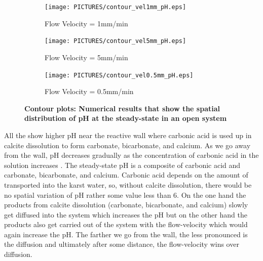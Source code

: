 \begin{figure}[!h]
\centering
    \begin{subfigure}{.5\linewidth}
        \centering
        \texttt{[image: PICTURES/contour\_vel1mm\_pH.eps]}
        \caption{\small Flow Velocity = 1mm/min}
        \label{fig:pHSteady-state}       %
    \end{subfigure}%
    \hfill
    \begin{subfigure}{.5\linewidth}
        \centering
        \texttt{[image: PICTURES/contour\_vel5mm\_pH.eps]}
        \caption{\small Flow Velocity = 5mm/min}
        \label{fig:pHSteady-state5mm}       %
    \end{subfigure}%
    \hfill
    \begin{subfigure}{.5\linewidth}
        \centering
        \texttt{[image: PICTURES/contour\_vel0.5mm\_pH.eps]}
        \caption{\small Flow Velocity = 0.5mm/min}
        \label{fig:pHSteady-state0.5mm}       %
    \end{subfigure}%
    \caption [\DuMuX Contour plots: Numerical results that show the spatial distribution of pH at the steady-state in an open system] {\textbf{\DuMuX Contour plots: Numerical results that show the spatial distribution of pH at the steady-state in an open system}}
     \label{fig:contourpH}
\end{figure}

All the  show higher pH near the reactive wall 
where carbonic acid is used up in calcite dissolution to form carbonate, bicarbonate, and calcium. 
As we go away from the wall, pH decreases gradually as the concentration of carbonic acid in the solution increases . 
The steady-state pH is a composite of carbonic acid and carbonate, bicarbonate, and calcium. Carbonic acid depends on the amount of  
transported into the karst water, so, without calcite dissolution, there would be no spatial variation of pH rather some value less than 6. 
On the one hand the products from calcite dissolution (carbonate, bicarbonate, and calcium) slowly get diffused into the system which 
increases the pH but on the other hand the products also get carried 
out of the system with the flow-velocity which would again increase the pH. The farther we go from the wall, the less pronounced is the diffusion 
and ultimately after some distance, the flow-velocity wins over diffusion. \\

